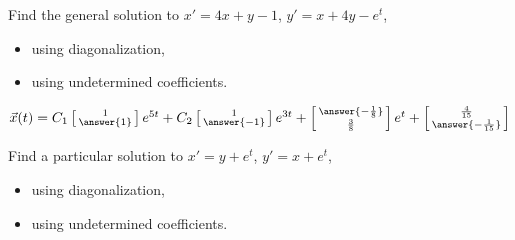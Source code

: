 \documentclass{ximera}
\begin{document}
\begin{exercise}
    Find the general solution to $x' = 4x+ y -1$,  $y' = x + 4y -e^t$,
    \begin{itemize}
        \item using diagonalization,
        \item using undetermined coefficients.
    \end{itemize}
    $\vec{x}(t) = C_1\left[\begin{smallmatrix} 1\\ \answer{1} \end{smallmatrix}\right]e^{5t} + C_2\left[\begin{smallmatrix} 1 \\ \answer{-1} \end{smallmatrix}\right]e^{3t} + \left[\begin{smallmatrix} \answer{-\frac{1}{8}} \\ \frac{3}{8} \end{smallmatrix}\right]e^{t} + \left[\begin{smallmatrix} \frac{4}{15} \\ \answer{-\frac{1}{15}} \end{smallmatrix}\right]$
\end{exercise}

\begin{exercise}%
    Find a particular solution to $x' = y + e^t$, $y' = x +e^t$,
    \begin{itemize}
        \item using diagonalization,
        \item using undetermined coefficients.
    \end{itemize}
\end{exercise}
\end{document}
